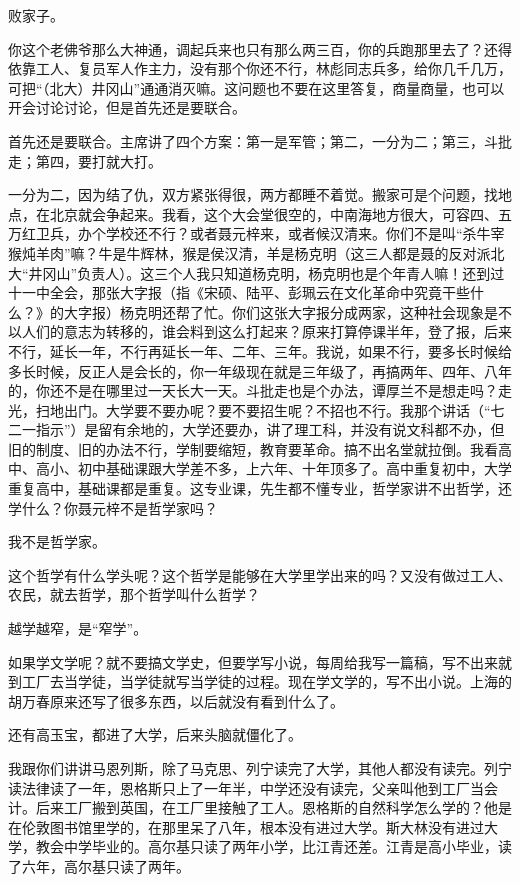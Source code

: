 败家子。

你这个老佛爷那么大神通，调起兵来也只有那么两三百，你的兵跑那里去了？还得依靠工人、复员军人作主力，没有那个你还不行，林彪同志兵多，给你几千几万，可把“（北大）井冈山”通通消灭嘛。这问题也不要在这里答复，商量商量，也可以开会讨论讨论，但是首先还是要联合。

首先还是要联合。主席讲了四个方案：第一是军管；第二，一分为二；第三，斗批走；第四，要打就大打。

一分为二，因为结了仇，双方紧张得很，两方都睡不着觉。搬家可是个问题，找地点，在北京就会争起来。我看，这个大会堂很空的，中南海地方很大，可容四、五万红卫兵，办个学校还不行？或者聂元梓来，或者候汉清来。你们不是叫“杀牛宰猴炖羊肉”嘛？牛是牛辉林，猴是侯汉清，羊是杨克明（这三人都是聂的反对派北大“井冈山”负责人）。这三个人我只知道杨克明，杨克明也是个年青人嘛！还到过十一中全会，那张大字报（指《宋硕、陆平、彭珮云在文化革命中究竟干些什么？》的大字报）杨克明还帮了忙。你们这张大字报分成两家，这种社会现象是不以人们的意志为转移的，谁会料到这么打起来？原来打算停课半年，登了报，后来不行，延长一年，不行再延长一年、二年、三年。我说，如果不行，要多长时候给多长时候，反正人是会长的，你一年级现在就是三年级了，再搞两年、四年、八年的，你还不是在哪里过一天长大一天。斗批走也是个办法，谭厚兰不是想走吗？走光，扫地出门。大学要不要办呢？要不要招生呢？不招也不行。我那个讲话（“七二一指示”）是留有余地的，大学还要办，讲了理工科，并没有说文科都不办，但旧的制度、旧的办法不行，学制要缩短，教育要革命。搞不出名堂就拉倒。我看高中、高小、初中基础课跟大学差不多，上六年、十年顶多了。高中重复初中，大学重复高中，基础课都是重复。这专业课，先生都不懂专业，哲学家讲不出哲学，还学什么？你聂元梓不是哲学家吗？

我不是哲学家。

这个哲学有什么学头呢？这个哲学是能够在大学里学出来的吗？又没有做过工人、农民，就去哲学，那个哲学叫什么哲学？

越学越窄，是“窄学”。

如果学文学呢？就不要搞文学史，但要学写小说，每周给我写一篇稿，写不出来就到工厂去当学徒，当学徒就写当学徒的过程。现在学文学的，写不出小说。上海的胡万春原来还写了很多东西，以后就没有看到什么了。

还有高玉宝，都进了大学，后来头脑就僵化了。

我跟你们讲讲马恩列斯，除了马克思、列宁读完了大学，其他人都没有读完。列宁读法律读了一年，恩格斯只上了一年半，中学还没有读完，父亲叫他到工厂当会计。后来工厂搬到英国，在工厂里接触了工人。恩格斯的自然科学怎么学的？他是在伦敦图书馆里学的，在那里呆了八年，根本没有进过大学。斯大林没有进过大学，教会中学毕业的。高尔基只读了两年小学，比江青还差。江青是高小毕业，读了六年，高尔基只读了两年。

